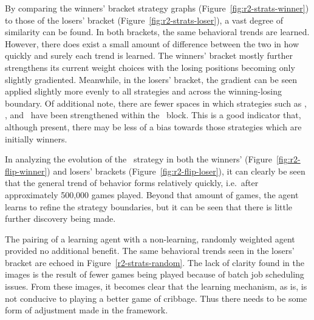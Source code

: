 By comparing the winners' bracket strategy graphs
(Figure~\ref{fig:r2-strats-winner})
to those of the losers' bracket
(Figure~\ref{fig:r2-strats-loser}),
a vast degree of similarity can be found.
%
In both brackets,
the same behavioral trends are learned.
%
However,
there does exist a small amount of difference between the two
in how quickly and surely each trend is learned.
%
The winners' bracket mostly further strengthens its current weight choices
with the losing positions becoming only slightly gradiented.
%
Meanwhile,
in the losers' bracket,
the gradient can be seen applied slightly more evenly to all strategies
and
across the winning-losing boundary.
%
Of additional note,
there are fewer spaces in which
strategies such as \cribminavg, \peggingmaxavggained, and \peggingminavggiven\ 
have been strengthened within the \handmaxmin\ block.
%
This is a good indicator that,
although present,
there may be less of a bias towards those strategies which are initially winners.


In analyzing the evolution of the \handmaxavg\ strategy in both the winners'
(Figure~\ref{fig:r2-flip-winner})
and losers' brackets (Figure~\ref{fig:r2-flip-loser}),
it can clearly be seen that the general trend of behavior forms
relatively quickly,
i.e.\  after approximately 500,000 games played.
%
Beyond that amount of games,
the agent learns to refine the strategy boundaries,
but it can be seen that there is little further discovery being made.








The pairing of a learning agent with a non-learning, randomly weighted agent
provided no additional benefit.
%
The same behavioral trends seen in the losers' bracket are echoed
in Figure~\ref{r2-strats-random}.
%
The lack of clarity found in the images is the result of
fewer games being played because of batch job scheduling issues.
%
From these images,
it becomes clear that the learning mechanism,
as is,
is not conducive to playing a better game of cribbage.
%
Thus there needs to be some form of adjustment made in the framework.








